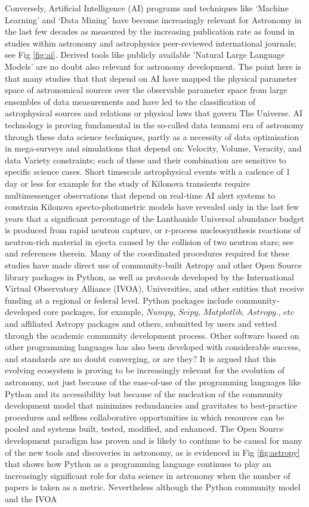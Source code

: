 \documentclass[final,5p,times,twocolumn,authoryear]{elsarticle}
\begin{document}
Conversely, Artificial Intelligence (AI) programs and techniques like `Machine Learning' and `Data Mining' have become increasingly relevant for Astronomy in the last few decades as measured by the increasing publication rate as found in studies within astronomy and astrophysics peer-reviewed international journals; see Fig \ref{fig:ai}.  Derived tools like publicly available 'Natural Large Language Models' are no doubt also relevant for astronomy development. The point here is that many studies that that depend on AI have mapped the physical parameter space of astronomical sources over the observable parameter space from large ensembles of data measurements and have led to the classification of astrophysical sources and relations or physical laws that govern The Universe. AI technology is proving fundamental in the so-called data tsunami era of astronomy through these data science techniques, partly as a necessity of data optimisation in mega-surveys and simulations that depend on: Velocity, Volume, Veracity, and data Variety constraints; each of these and their combination are sensitive to specific science cases. Short timescale astrophysical events with a cadence of 1 day or less for example for the study of Kilonova transients require multimessenger observations that depend on real-time AI alert systems to constrain Kilonova specto-photometric models have revealed only in the last few years that a significant percentage of the Lanthanide Universal abundance budget is produced from rapid neutron capture, or r-process nucleosynthesis reactions of neutron-rich material in ejecta caused by the collision of two neutron stars; see \cite{artola2020} and references therein. Many of the coordinated procedures required for these studies have made direct use of community-built Astropy and other Open Source library packages in Python, as well as protocols developed by the International Virtual Observatory Alliance (IVOA), Universities, and other entities that receive funding at a regional or federal level. Python packages include community-developed core packages, for example, $\textit{Numpy, Scipy, Matplotlib, Astropy., etc}$  and affiliated Astropy packages and others, submitted by users and vetted through the academic community development process. Other software based on other programming languages has also been developed with considerable success, and standards are no doubt converging, or are they? It is argued that this evolving ecosystem is proving to be increasingly relevant for the evolution of astronomy, not just because of the ease-of-use of the programming languages like Python and its accessibility but because of the nucleation of the community development model that minimizes redundancies and gravitates to best-practice procedures and selfless collaborative opportunities in which resources can be pooled and systems built, tested, modified, and enhanced. The Open Source development paradigm has proven and is likely to continue to be causal for many of the new tools and discoveries in astronomy, as is evidenced in Fig \ref{fig:astropy} that shows how Python as a programming language continues to play an increasingly significant role for data science in astronomy when the number of papers is taken as a metric.  Nevertheless although the Python community model and the IVOA 
\end{document}
